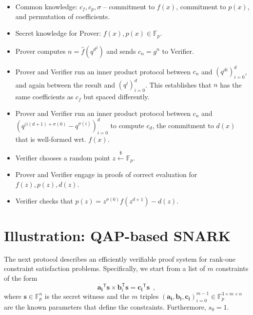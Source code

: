 \documentclass{article}
\begin{document}
\begin{itemize}
    \item Common knowledge: $c_f, c_p, \sigma$ -- commitment to $f(x)$, commitment to $p(x)$, and permutation of coefficients.
    \item Secret knowledge for Prover: $f(x), p(x) \in \mathbb{F}_p$.
    \item Prover computes $n = \hat{f}(q^{d^2})$ and sends $c_n = g^n$ to Verifier.
    \item Prover and Verifier run an inner product protocol between $c_n$ and $(q^{di})_{i=0}^d$, and again between the result and $(q^i)_{i=0}^d$. This establishes that $n$ has the same coefficients as $c_f$ but spaced differently.
    \item Prover and Verifier run an inner product protocol between $c_n$ and $(q^{(i(d+1) + \sigma(0)} - q^{\sigma(i)})_{i=0}^d$ to compute $c_d$, the commitment to $d(x)$ that is well-formed wrt. $f(x)$.
    \item Verifier chooses a random point $z \xleftarrow{\$} \mathbb{F}_p$.
    \item Prover and Verifier engage in proofs of correct evaluation for $f(z), p(z), d(z)$.
    \item Verifier checks that $p(z) = z^{\sigma(0)} f(z^{d+1}) - d(z)$.
\end{itemize}

\section{Illustration: QAP-based SNARK}

The next protocol describes an efficiently verifiable proof system for rank-one constraint satisfaction problems. Specifically, we start from a list of $m$ constraints of the form
\begin{equation} \label{equation:r1cs}
    \mathbf{a_i}^\mathsf{T} \mathbf{s} \times \mathbf{b}_i^\mathsf{T} \mathbf{s} = \mathbf{c_i}^\mathsf{T} \mathbf{s} \enspace ,
\end{equation}
where $\mathbf{s} \in \mathbb{F}_p^n$ is the secret witness and the $m$ triples $(\mathbf{a_i}, \mathbf{b_i}, \mathbf{c_i})_{i=0}^{m-1} \in \mathbb{F}_p^{3 \times m \times n}$ are the known parameters that define the constraints. Furthermore, $s_0 = 1$.
\end{document}

